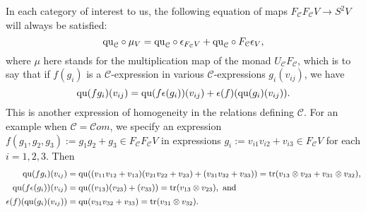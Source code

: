 \documentclass[11pt]{amsart}
\theoremstyle{plain}
\theoremstyle{definition}
\DeclareMathOperator{\trace}{tr}
\renewcommand{\to}{\longrightarrow}
\newcommand{\scrC}{\mathscr{C}}
\newcommand{\calC}{\mathcal{C}}
\newcommand{\calc}{\mathcal{C}}
\theoremstyle{plain}
\newcommand{\quadratic}{\textup{qu}}
\newcommand{\algs}{{\scrC\!\textit{om}}}
\begin{document}
\begin{CPiAlgs and CHalgs}
In each category of interest to us, the following equation of maps $F_\calC F_\calC V\to S^2 V$ will always be satisfied:
\[\quadratic_\calC\circ\mu_V=\quadratic_\calC\circ \epsilon_{F_\calC V} +\quadratic_\calC\circ {F_\calC \epsilon_V},\]
where $\mu$ here stands for the multiplication map of the monad $U_\calC F_\calC $, which is to say that if  $f(g_i)$ is a $\calC$-expression in various $\calC$-expressions $g_i(v_{ij})$, we have 
\[\quadratic(fg_i)(v_{ij})=\quadratic(f\epsilon(g_i))(v_{ij})+\epsilon(f)(\quadratic(g_i)(v_{ij})).\]
This is another expression of homogeneity in the relations defining $\calC$. For an example when $\calC=\algs$, we specify an expression $f(g_1,g_2,g_3):=g_1g_2+g_3\in F_{\calc}F_{\calc}V$ in expressions $g_i:=v_{i1}v_{i2}+v_{i3}\in F_{\calc}V$ for each $i=1,2,3$. Then
\begin{alignat*}{2}
\textup{\small$\quadratic(fg_i)(v_{ij})={}$}
&
\textup{\small$\quadratic((v_{11}v_{12}+v_{13})(v_{21}v_{22}+v_{23})+(v_{31}v_{32}+v_{33}))=\trace(v_{13}\otimes v_{23}+v_{31}\otimes v_{32}),$}
\\
\textup{\small$\quadratic(f\epsilon(g_i))(v_{ij})={}$}
&
\textup{\small$\quadratic((v_{13})(v_{23})+(v_{33}))=\trace(v_{13}\otimes v_{23}),\textup{ and}$}
\\
\textup{\small$\epsilon(f)(\quadratic(g_i)(v_{ij}))={}$}
&
\textup{\small$\quadratic(v_{31}v_{32}+v_{33})=\trace(v_{31}\otimes v_{32}).$}
\end{alignat*}










\end{CPiAlgs and CHalgs}
\end{document}
